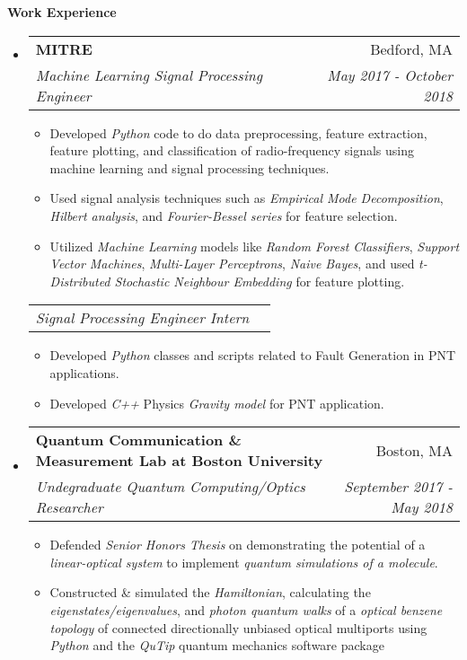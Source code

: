 \documentclass[letterpaper, 8pt]{extarticle}
\makeatletter
\newcommand{\resitem}[1]{\item #1 \vspace{-2pt}}
\newcommand{\resheading}[1]{{\large \colorbox{mygrey}{\begin{minipage}{0.99\textwidth}{\textbf{#1 \vphantom{p\^{E}}}}\end{minipage}}}}
\newcommand{\ressubheading}[4]{
\begin{tabular*}{7.40in}{l@{\extracolsep{\fill}}r}
		\textbf{#1} & #2 \\
		\textit{#3} & \textit{#4} \\
\end{tabular*}\vspace{-6pt}}
\newcommand{\rehead}[2]{
\begin{tabular*}{7.40in}{l@{\extracolsep{\fill}}r}
        \textit{#1} & \textit{#2} \\
\end{tabular*}\vspace{-6pt}}
\makeatother
\begin{document}
\resheading{Work Experience}
\begin{itemize}
\setlength{\leftmargini}{0.5em}
\item
	\ressubheading{MITRE}{Bedford, MA}{Machine Learning Signal Processing Engineer}{May 2017 - October 2018}
	\begin{itemize}
		\resitem{Developed \emph{Python} code to do data preprocessing, feature extraction, feature plotting, and classification of radio-frequency signals using machine learning and signal processing techniques.}
        \resitem{Used signal analysis techniques such as \emph{Empirical Mode Decomposition}, \emph{Hilbert analysis}, and \emph{Fourier-Bessel series} for feature selection.}
        \resitem{Utilized \emph{Machine Learning} models like \emph{Random Forest Classifiers}, \emph{Support Vector Machines}, \emph{Multi-Layer Perceptrons}, \emph{Naive Bayes}, and used \emph{t-Distributed Stochastic Neighbour Embedding} for feature plotting.}
	\end{itemize}
	\vspace{-3pt}
	\rehead{Signal Processing Engineer Intern}{}
	\begin{itemize}
		\resitem{Developed \emph{Python} classes and scripts related to Fault Generation in PNT applications.}
		\resitem{Developed \emph{C++} Physics \emph{Gravity model} for PNT application.}
	\end{itemize}
\item
	\ressubheading{Quantum Communication \& Measurement Lab at Boston University}{Boston, MA}{Undegraduate Quantum Computing/Optics Researcher}{September 2017 - May 2018}
	\begin{itemize}
	    \resitem{Defended \emph{Senior Honors Thesis} on demonstrating the potential of a \emph{linear-optical system} to implement \emph{quantum simulations of a molecule}.}
        \resitem{Constructed \& simulated the \emph{Hamiltonian}, calculating the \emph{eigenstates/eigenvalues}, and \emph{photon quantum walks} of a \emph{optical benzene topology} of connected directionally unbiased optical multiports using \emph{Python} and the \emph{QuTip} quantum mechanics software package}

\end{itemize}
\end{itemize}
\end{document}
